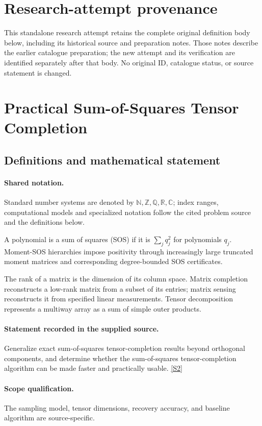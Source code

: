 \documentclass[11pt]{article}
\begin{document}
\section*{Research-attempt provenance}
This standalone research attempt retains the complete original definition body below,
including its historical source and preparation notes. Those notes describe the
earlier catalogue preparation; the new attempt and its verification are identified
separately after that body. No original ID, catalogue status, or source statement is changed.

\section{Practical Sum-of-Squares Tensor Completion}\label{statement}

\subsection{Definitions and mathematical statement}

\paragraph{Shared notation.}Standard number systems are denoted by $\mathbb N,\mathbb Z,\mathbb Q,\mathbb R,\mathbb C$; index ranges, computational models and specialized notation follow the cited problem source and the definitions below.


A polynomial is a sum of squares (SOS) if it is $\sum_j q_j^2$ for polynomials $q_j$. Moment-SOS hierarchies impose positivity through increasingly large truncated moment matrices and corresponding degree-bounded SOS certificates.

The rank of a matrix is the dimension of its column space. Matrix completion reconstructs a low-rank matrix from a subset of its entries; matrix sensing reconstructs it from specified linear measurements. Tensor decomposition represents a multiway array as a sum of simple outer products.
\paragraph{Statement recorded in the supplied source.}
Generalize exact sum-of-squares tensor-completion results beyond orthogonal components, and determine whether the sum-of-squares tensor-completion algorithm can be made faster and practically usable. \href{https://doi.org/10.4171/owr/2017/37}{[S2]}
\paragraph{Scope qualification.}
The sampling model, tensor dimensions, recovery accuracy, and baseline algorithm are source-specific.
\end{document}
